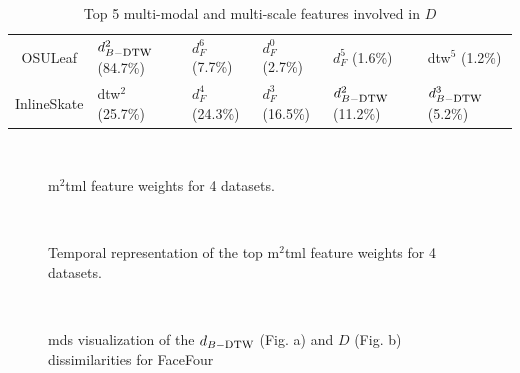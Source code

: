 \begin{table}[h!]
{\begin{tabular}{| c |  l l l l l |}
			\\
			OSULeaf				& $d_{B-\mbox{\sc dtw}}^2$ (84.7\%) &$d_F^6$ (7.7\%) &$d_F^0$ (2.7\%) &$d_F^5$ (1.6\%) & {\sc dtw}$^5$ (1.2\%)
			\\
			InlineSkate			& {\sc dtw}$^2$ (25.7\%) &$d_F^4$ (24.3\%) &$d_F^3$ (16.5\%) &$d_{B-\mbox{\sc dtw}}^2$ (11.2\%) &$d_{B-\mbox{\sc dtw}}^3$ (5.2\%)		 
			\\
			\hline
		\end{tabular}
	}
	\caption{Top 5  multi-modal and multi-scale features involved in  $D$}
	\label{tab-feature}
\end{table}

\begin{figure}[h!]
	\centering
	 \
	\    
	 \
	\caption{{\sc m}$^2${\sc tml} feature weights for 4 datasets.}
	\label{fig:w}
\end{figure}

\begin{figure}[h!]
	\centering
	 \   
	\caption{Temporal representation of the top {\sc m}$^2${\sc tml} feature weights for 4 datasets.}
	\label{fig:temporal_rep}
\end{figure}



\begin{figure}[h!]
	\centering
	 \  
	\caption{{\sc mds} visualization of the $d_{B-\mbox{\sc dtw}}$ (Fig. a) and $D$ (Fig. b) dissimilarities for FaceFour}
	\label{fig:mds}
\end{figure}

